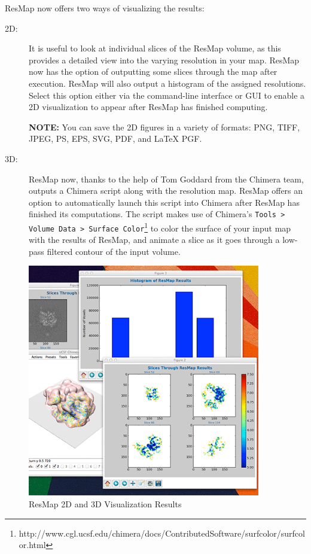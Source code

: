 \documentclass[10pt]{article}
\begin{document}
ResMap now offers two ways of visualizing the results:
\begin{description}
	\item[2D:] It is useful to look at individual slices of the ResMap volume, as this provides a detailed view into the varying resolution in your map. ResMap now has the option of outputting some slices through the map after execution. ResMap will also output a histogram of the assigned resolutions. Select this option either via the command-line interface or GUI to enable a 2D visualization to appear after ResMap has finished computing.

	\textcolor{RedOrange}{\textbf{NOTE:}} You can save the 2D figures in a variety of formats: PNG, TIFF, JPEG, PS, EPS, SVG, PDF, and \LaTeX{} PGF.

	\item[3D:] ResMap now, thanks to the help of Tom Goddard from the Chimera team, outputs a Chimera script along with the resolution map. ResMap offers an option to automatically launch this script into Chimera after ResMap has finished its computations. The script makes use of Chimera's \texttt{Tools > Volume Data > Surface Color}\footnote{http://www.cgl.ucsf.edu/chimera/docs/ContributedSoftware/surfcolor/surfcolor.html} to color the surface of your input map with the results of ResMap, and animate a slice as it goes through a low-pass filtered contour of the input volume.
\end{description}

\begin{figure}[!h]
\centering
\includegraphics[width=4in]{img/viz.png}
\caption{ResMap 2D and 3D Visualization Results}
\end{figure}
\end{document}

